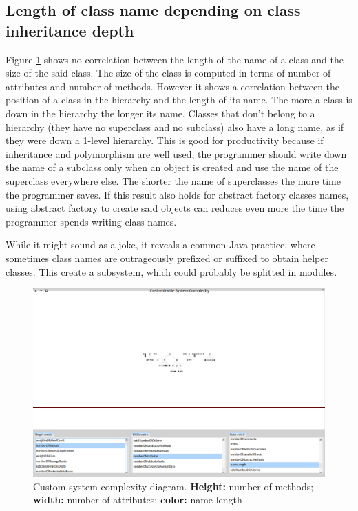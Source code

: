 \subsection{Length of class name depending on class inheritance depth}
Figure \ref{fig:namelength} shows no correlation between the length of the name of a class and the size of the said class. The size of the class is computed in terms of number of attributes and number of methods.
However it shows a correlation between the position of a class in the hierarchy and the length of its name. The more a class is down in the hierarchy the longer its name. Classes that don't belong to a hierarchy (they have no superclass and no subclass) also have a long name, as if they were down a 1-level hierarchy. This is good for productivity because if inheritance and polymorphism are well used, the programmer should write down the name of a subclass only when an object is created and use the name of the superclass everywhere else. The shorter the name of superclasses the more time the programmer saves. If this result also holds for abstract factory classes names, using abstract factory to create said objects can reduces even more the time the programmer spends writing class names.

While it might sound as a joke, it reveals a common Java practice, where sometimes class names are outrageously prefixed or suffixed to obtain helper classes. This create a subsystem, which could probably be splitted in modules.

\begin{figure}[H]
    \includegraphics[width=\textwidth]{namelength.png}
    \caption{\label{fig:namelength} Custom system complexity diagram. \textbf{Height:} number of methods; \textbf{width:} number of attributes; \textbf{color:} name length}
\end{figure}

